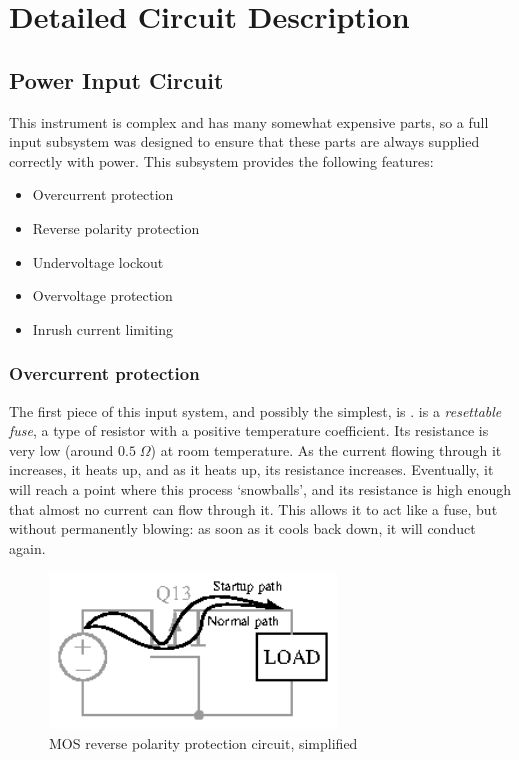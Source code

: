 \section{Detailed Circuit Description}
\subsection{Power Input Circuit}

This instrument is complex and has many somewhat expensive parts, so a full
input subsystem was designed to ensure that these parts are always supplied
correctly with power. This subsystem provides the following features:

\begin{itemize}
\item{Overcurrent protection}
\item{Reverse polarity protection}
\item{Undervoltage lockout}
\item{Overvoltage protection}
\item{Inrush current limiting}
\end{itemize}

\subsubsection{Overcurrent protection}

The first piece of this input system, and possibly the simplest, is
.  is a \emph{resettable fuse}, a type of resistor
with a positive temperature coefficient. Its resistance is very low
(around $0.5\;\Omega$) at room temperature.  As the current flowing through it
increases, it heats up, and as it heats up, its resistance increases.
Eventually, it will reach a point where this process `snowballs', and its
resistance is high enough that almost no current can flow through it. This
allows it to act like a fuse, but without permanently blowing: as soon as it
cools back down, it will conduct again.

\begin{figure}[H]
\centering
\includegraphics[width=3in]{mosrpp}
\caption{MOS reverse polarity protection circuit, simplified}
\label{fig:mosrpp}
\end{figure}

